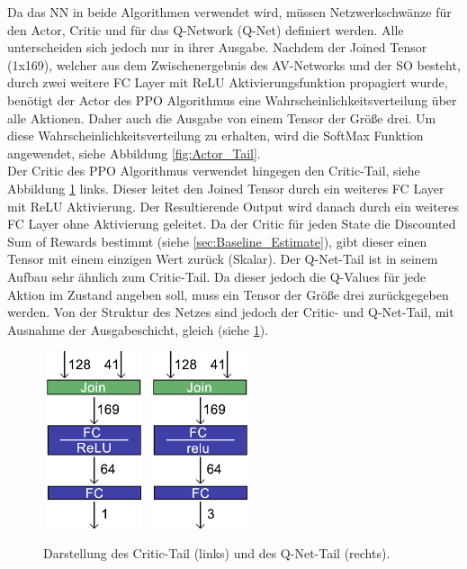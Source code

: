 Da das NN in beide Algorithmen verwendet wird, müssen Netzwerkschwänze für den Actor, Critic und für das Q-Network (Q-Net) definiert werden. Alle unterscheiden sich jedoch nur in ihrer Ausgabe. 
Nachdem der Joined Tensor (1x169), welcher aus dem Zwischenergebnis des AV-Networks und der SO besteht, durch zwei weitere FC Layer mit ReLU Aktivierungsfunktion propagiert wurde, benötigt der Actor des PPO Algorithmus eine Wahrscheinlichkeitsverteilung über alle Aktionen. Daher auch die Ausgabe von einem Tensor der Größe drei. Um diese Wahrscheinlichkeitsverteilung zu erhalten, wird die SoftMax Funktion angewendet, siehe Abbildung \ref{fig:Actor_Tail}.\\
Der Critic des PPO Algorithmus verwendet hingegen den Critic-Tail, siehe Abbildung \ref{fig:Critic_Q_Tail} links. Dieser leitet den Joined Tensor durch ein weiteres FC Layer mit ReLU Aktivierung. Der Resultierende Output wird danach durch ein weiteres FC Layer ohne Aktivierung geleitet. Da der Critic für jeden State die Discounted Sum of Rewards bestimmt (siehe \ref{sec:Baseline_Estimate}), gibt dieser einen Tensor mit einem einzigen Wert zurück (Skalar).
Der Q-Net-Tail ist in seinem Aufbau sehr ähnlich zum Critic-Tail. Da dieser jedoch die Q-Values für jede Aktion im Zustand angeben soll, muss ein Tensor der Größe drei zurückgegeben werden. Von der Struktur des Netzes sind jedoch der Critic- und Q-Net-Tail, mit Ausnahme der Ausgabeschicht, gleich (siehe \ref{fig:Critic_Q_Tail}).
\begin{figure}[H]
	\centering
	\includegraphics[width=3cm, height=5.2cm]{Abbildungen/Critic.png}
	\hspace{.3\linewidth}%
	\includegraphics[width=3cm, height=5.2cm]{Abbildungen/QNet.png}
	\caption[Critic- und Q-Net-Tail]{Darstellung des Critic-Tail (links) und des Q-Net-Tail (rechts).}
	\label{fig:Critic_Q_Tail}
\end{figure}

